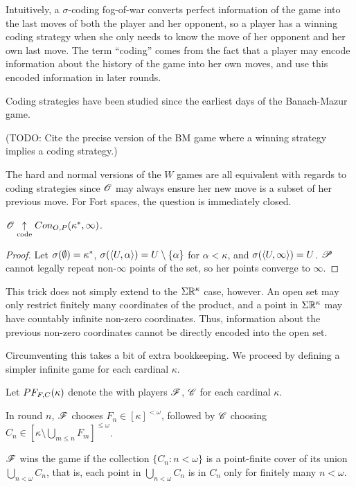 Intuitively, a $\sigma$-coding fog-of-war converts perfect information of the
game into the last moves of both the player and her opponent, so a player has
a winning coding strategy when she only needs to know the move of her opponent
and her own last move. The term ``coding'' comes from the fact
that a player may encode information about the history of the game into
her own moves, and use this encoded information in later rounds.

Coding strategies have been studied since the earliest days of the
Banach-Mazur game.

\begin{thm}
  (TODO: Cite the precise version of the BM game where a winning strategy
    implies a coding strategy.)
\end{thm}

The hard and normal versions of the $W$ games are all equivalent with regards
to coding strategies since $\mathscr{O}$
may always ensure her new move is a subset of her previous move. For
Fort spaces, the question is immediately closed.

\begin{prop}
  $\mathscr{O} \underset{\text{code}}{\uparrow} Con_{O,P}(\kappa^*,\infty)$.
\end{prop}

\begin{proof}
  Let $\sigma(\emptyset)=\kappa^*$,
  $\sigma(\langle U,\alpha\rangle)=U\setminus\{\alpha\}$ for $\alpha<\kappa$,
  and $\sigma(\langle U,\infty\rangle)=U$. $\mathscr{P}$
  cannot legally repeat non-$\infty$ points of the set, so her points converge
  to $\infty$.
\end{proof}

This trick does not simply extend to the $\Sigma\mathbb{R}^{\kappa}$ case, however.
An open set may only restrict finitely many coordinates of the product,
and a point in $\Sigma\mathbb{R}^{\kappa}$ may have countably infinite non-zero
coordinates. Thus, information about the previous non-zero coordinates cannot be
directly encoded into the open set.

Circumventing this takes a bit of extra bookkeeping. We proceed by defining
a simpler infinite game for each cardinal $\kappa$.

\begin{game}
  Let $PF_{F,C}(\kappa)$ denote the  with players
  $\mathscr{F}$, $\mathscr{C}$ for each cardinal $\kappa$.

  In round $n$, $\mathscr{F}$ chooses $F_n\in[\kappa]^{<\omega}$, followed by
  $\mathscr{C}$ choosing $C_n\in[\kappa\setminus\bigcup_{m\leq n}F_m]^{\leq\omega}$.

  $\mathscr{F}$ wins the game if the collection $\{C_n:n<\omega\}$ is a point-finite
  cover of its union $\bigcup_{n<\omega} C_n$, that is, each point in
  $\bigcup_{n<\omega} C_n$ is in $C_n$ only for finitely many $n<\omega$.
\end{game}

